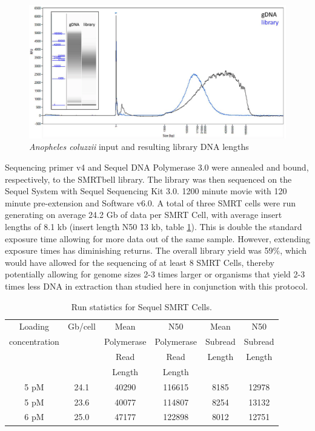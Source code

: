\begin{figure}[htbp!]
\caption{\textit{Anopheles coluzzii} input and resulting library DNA lengths}
\label{figure:fempto}
\begin{centering}
\includegraphics[width=.85\textwidth]{fempto.png}
\end{centering}
\end{figure}

\par{
Sequencing primer v4 and Sequel DNA Polymerase 3.0 were annealed and bound, respectively, to the SMRTbell library. The library was then sequenced on the Sequel System with Sequel Sequencing Kit 3.0. 1200 minute movie with 120 minute pre-extension and Software v6.0. A total of three SMRT cells were run generating on average 24.2 Gb of data per SMRT Cell, with average insert lengths of 8.1 kb (insert length N50 \~13 kb, table \ref{table:dataamount}). This is double the standard exposure time allowing for more data out of the same sample. However, extending exposure times has diminishing returns. The overall library yield was 59\%, which would have allowed for the sequencing of at least 8 SMRT Cells, thereby potentially allowing for genome sizes 2-3 times larger or organisms that yield 2-3 times less DNA in extraction than studied here in conjunction with this protocol.
}

\begin{table}[htbp!]
\caption{Run statistics for Sequel SMRT Cells.}\label{table:dataamount}
\begin{tabular}{| c | c | c | c | c | c |}
\hline
Loading & Gb/cell & Mean  & N50 &  Mean &  N50  \\
concentration & & Polymerase & Polymerase & Subread & Subread \\
& & Read & Read & Length & Length \\ 
& & Length &Length & & \\\hline
5 pM & 24.1 & 40290 & 116615 & 8185 & 12978 \\\hline
5 pM & 23.6 & 40077 & 114807 & 8254 & 13132 \\\hline
6 pM & 25.0 & 47177 & 122898 & 8012 & 12751 \\\hline
\end{tabular}
\end{table}



